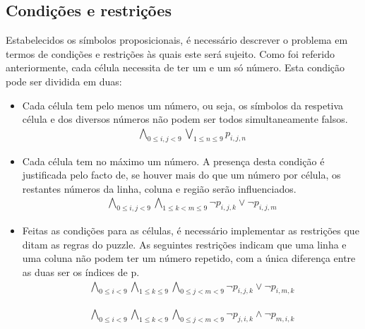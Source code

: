 \documentclass[a4paper,12pt]{article}
\theoremstyle{definition}
\theoremstyle{theorem}
\theoremstyle{remark}
\begin{document}
\subsection{Condições e restrições}
Estabelecidos os símbolos proposicionais, é necessário descrever o problema em
termos de condições e restrições às quais este será sujeito.  Como foi referido
anteriormente, cada célula necessita de ter um e um só número. Esta condição
pode ser dividida em duas:
\begin{itemize}
     \item Cada célula tem pelo menos um número, ou seja, os símbolos da
        respetiva célula e dos diversos números não podem ser todos
        simultaneamente falsos.
        \begin{align}
        \bigwedge_{0\leq i,j < 9}
           \bigvee_{1\leq n \leq 9} p_{i,j,n}
        \end{align}
     
      \item Cada célula tem no máximo um número. A presença desta condição é
        justificada pelo facto de, se houver mais do que um número por célula,
        os restantes números da linha, coluna e região serão influenciados.
        \begin{align}
        \bigwedge_{0\leq i,j < 9}
           \bigwedge_{1\leq k < m \leq 9}
           {\lnot p_{i,j,k} \lor \lnot p_{i,j,m}}
        \end{align}

      \item Feitas as condições para as células, é necessário implementar as
         restrições que ditam as regras do puzzle.  As seguintes restrições
         indicam que uma linha e uma coluna não podem ter um número repetido,
         com a única diferença entre as duas ser os índices de p.
         \begin{align}
         \bigwedge_{0\leq i < 9} \bigwedge_{1\leq k \leq 9} \bigwedge_{0\leq j < m
         < 9} \lnot p_{i,j,k}
         \lor \lnot p_{i,m,k}
         \end{align}

         \begin{align}
         \bigwedge_{0\leq i < 9} \bigwedge_{1\leq k < 9} 
            \bigwedge_{0\leq j < m < 9}
               \lnot p_{j,i,k} \land \lnot p_{m,i,k}
         \end{align}
         

\end{itemize}
\end{document}
